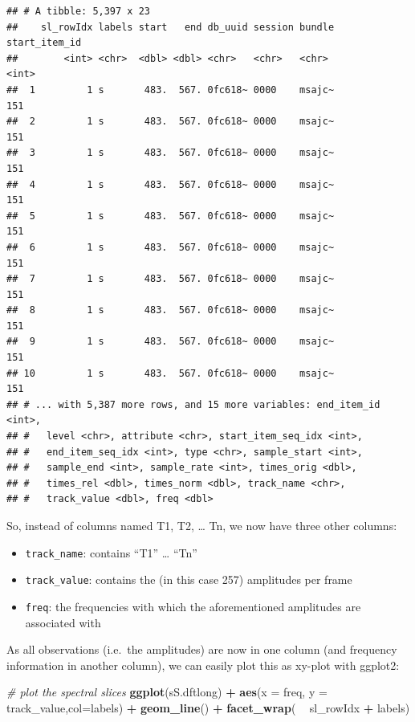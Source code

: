 \documentclass[]{book}
\newenvironment{Shaded}{\begin{snugshade}}{\end{snugshade}}
\newcommand{\CommentTok}[1]{\textcolor[rgb]{0.56,0.35,0.01}{\textit{#1}}}
\newcommand{\DataTypeTok}[1]{\textcolor[rgb]{0.13,0.29,0.53}{#1}}
\newcommand{\KeywordTok}[1]{\textcolor[rgb]{0.13,0.29,0.53}{\textbf{#1}}}
\newcommand{\NormalTok}[1]{#1}
\newcommand{\OperatorTok}[1]{\textcolor[rgb]{0.81,0.36,0.00}{\textbf{#1}}}
\newcommand{\StringTok}[1]{\textcolor[rgb]{0.31,0.60,0.02}{#1}}
\providecommand{\tightlist}{%
  \setlength{\itemsep}{0pt}\setlength{\parskip}{0pt}}
\begin{document}
\begin{verbatim}
## # A tibble: 5,397 x 23
##    sl_rowIdx labels start   end db_uuid session bundle start_item_id
##        <int> <chr>  <dbl> <dbl> <chr>   <chr>   <chr>          <int>
##  1         1 s       483.  567. 0fc618~ 0000    msajc~           151
##  2         1 s       483.  567. 0fc618~ 0000    msajc~           151
##  3         1 s       483.  567. 0fc618~ 0000    msajc~           151
##  4         1 s       483.  567. 0fc618~ 0000    msajc~           151
##  5         1 s       483.  567. 0fc618~ 0000    msajc~           151
##  6         1 s       483.  567. 0fc618~ 0000    msajc~           151
##  7         1 s       483.  567. 0fc618~ 0000    msajc~           151
##  8         1 s       483.  567. 0fc618~ 0000    msajc~           151
##  9         1 s       483.  567. 0fc618~ 0000    msajc~           151
## 10         1 s       483.  567. 0fc618~ 0000    msajc~           151
## # ... with 5,387 more rows, and 15 more variables: end_item_id <int>,
## #   level <chr>, attribute <chr>, start_item_seq_idx <int>,
## #   end_item_seq_idx <int>, type <chr>, sample_start <int>,
## #   sample_end <int>, sample_rate <int>, times_orig <dbl>,
## #   times_rel <dbl>, times_norm <dbl>, track_name <chr>,
## #   track_value <dbl>, freq <dbl>
\end{verbatim}

So, instead of columns named T1, T2, \ldots{} Tn, we now have three other columns:

\begin{itemize}
\tightlist
\item
  \texttt{track\_name}: contains ``T1'' \ldots{} ``Tn''
\item
  \texttt{track\_value}: contains the (in this case 257) amplitudes per frame
\item
  \texttt{freq}: the frequencies with which the aforementioned amplitudes are associated with
\end{itemize}

As all observations (i.e.~the amplitudes) are now in one column (and frequency information in another column), we can easily plot this as xy-plot with ggplot2:

\begin{Shaded}
\begin{Highlighting}[]
\CommentTok{# plot the spectral slices}
\KeywordTok{ggplot}\NormalTok{(sS.dftlong) }\OperatorTok{+}
\StringTok{  }\KeywordTok{aes}\NormalTok{(}\DataTypeTok{x =}\NormalTok{ freq, }\DataTypeTok{y =}\NormalTok{ track_value,}\DataTypeTok{col=}\NormalTok{labels) }\OperatorTok{+}
\StringTok{  }\KeywordTok{geom_line}\NormalTok{() }\OperatorTok{+}
\StringTok{  }\KeywordTok{facet_wrap}\NormalTok{( }\OperatorTok{~}\StringTok{ }\NormalTok{sl_rowIdx }\OperatorTok{+}\StringTok{ }\NormalTok{labels)}
\end{Highlighting}
\end{Shaded}
\end{document}

